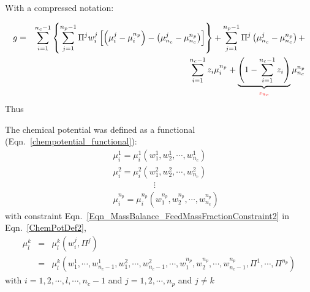 With a compressed notation:

\begin{eqnarray}
g &=& \summation_{i=1}^{n_{c}-1}\left\{\summation_{j=1}^{n_{p}-1}\Pi^{j}w_{i}^{j}\left[\left(\mu_{i}^{j}-\mu_{i}^{n_{p}}\right) - \left(\mu_{n_{c}}^{j}-\mu_{n_{c}}^{n_{p}}\right)\right]\right\} + \summation_{j=1}^{n_{p}-1}\Pi^{j}\left(\mu_{n_{c}}^{j}-\mu_{n_{c}}^{n_{p}}\right) +  \nonumber \\
&& \hspace{3cm} \summation_{i=1}^{n_{c}-1} z_{i}\mu_{i}^{n_{p}} + \underbrace{\left(1-\summation_{i=1}^{n_{c}-1}z_{i}\right)}_{\red{z_{n_{c}}}}\mu_{n_{c}}^{n_{p}} \nonumber 
\end{eqnarray}
Thus

The chemical potential was defined as a functional (Eqn.~\ref{chempotential_functional}):
\begin{eqnarray}
&& \mu_{i}^{1} = \mu_{i}^{1}\left(w_{1}^{1},w_{2}^{1},\cdots,w_{n_{c}}^{1}\right) \nonumber \\
&& \mu_{i}^{2} = \mu_{i}^{2}\left(w_{1}^{2},w_{2}^{2},\cdots,w_{n_{c}}^{2}\right) \nonumber \\
&& \hspace{2cm}\vdots \nonumber \\
&& \mu_{i}^{n_{p}} = \mu_{i}^{n_{p}}\left(w_{1}^{n_{p}},w_{2}^{n_{p}},\cdots,w_{n_{c}}^{n_{p}}\right) \label{ChemPotDef2}
\end{eqnarray}
with constraint Eqn.~\ref{Eqn_MassBalance_FeedMassFractionConstraint2} in Eqn.~\ref{ChemPotDef2},
\begin{eqnarray}
\mu_{l}^{k} &=& \mu_{l}^{k}\left(w_{i}^{j},\Pi^{j}\right) \nonumber \\
           &=& \mu_{l}^{k}\left(w_{1}^{1},\cdots,w_{n_{c}-1}^{1},w_{1}^{2},\cdots,w_{n_{c}-1}^{2},\cdots,w_{1}^{n_{p}},w_{2}^{n_{p}},\cdots,w_{n_{c}-1}^{n_{p}},\Pi^{1},\cdots,\Pi^{n_{p}}\right)\nonumber
\end{eqnarray}
with $i=1,2,\cdots,l,\cdots,n_{c}-1$ and $j = 1,2,\cdots,n_{p}$ and $j\neq k$

